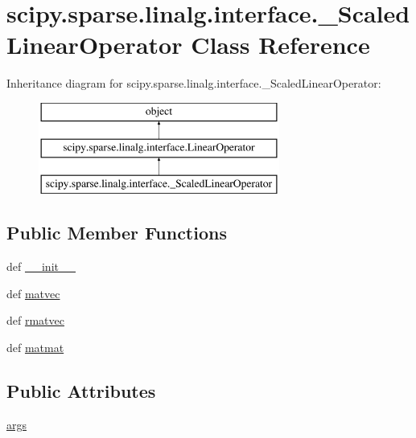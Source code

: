 \hypertarget{classscipy_1_1sparse_1_1linalg_1_1interface_1_1__ScaledLinearOperator}{}\section{scipy.\+sparse.\+linalg.\+interface.\+\_\+\+Scaled\+Linear\+Operator Class Reference}
\label{classscipy_1_1sparse_1_1linalg_1_1interface_1_1__ScaledLinearOperator}
Inheritance diagram for scipy.\+sparse.\+linalg.\+interface.\+\_\+\+Scaled\+Linear\+Operator\+:\begin{figure}[H]
\begin{center}
\leavevmode
\includegraphics[height=3.000000cm]{classscipy_1_1sparse_1_1linalg_1_1interface_1_1__ScaledLinearOperator}
\end{center}
\end{figure}
\subsection*{Public Member Functions}
\begin{DoxyCompactItemize}
\item 
def \hyperlink{classscipy_1_1sparse_1_1linalg_1_1interface_1_1__ScaledLinearOperator_aafd3e00f494395e8ccd4aa774ab92a36}{\+\_\+\+\_\+init\+\_\+\+\_\+}
\item 
def \hyperlink{classscipy_1_1sparse_1_1linalg_1_1interface_1_1__ScaledLinearOperator_a278a44dd099cd16b3e986b42422880d0}{matvec}
\item 
def \hyperlink{classscipy_1_1sparse_1_1linalg_1_1interface_1_1__ScaledLinearOperator_a13496349e7442348f923aeed941c676b}{rmatvec}
\item 
def \hyperlink{classscipy_1_1sparse_1_1linalg_1_1interface_1_1__ScaledLinearOperator_aa85e2d382a6bc8aa76e96e7308544fb3}{matmat}
\end{DoxyCompactItemize}
\subsection*{Public Attributes}
\begin{DoxyCompactItemize}
\item 
\hyperlink{classscipy_1_1sparse_1_1linalg_1_1interface_1_1__ScaledLinearOperator_a124338db02fcbecd78842b4c1dead336}{args}
\end{DoxyCompactItemize}



